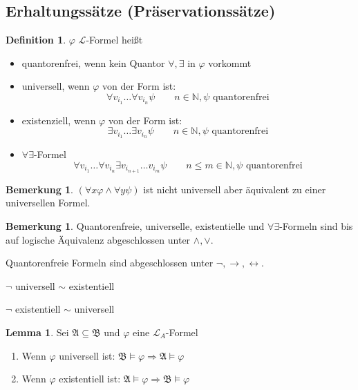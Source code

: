 \documentclass[12pt,parskip=full]{scrartcl}
\newcommand{\setN}{\mathbb{N}}
\theoremstyle{definition}
\newtheorem{lemma}[theorem]{Lemma}
\newtheorem{definition}[theorem]{Definition}
\newtheorem{remark}[theorem]{Bemerkung}
\begin{document}
	\subsection{Erhaltungssätze (Präservationssätze)}
	
	\begin{definition}
		$\varphi$ $\mathcal{L}$-Formel heißt
		\begin{itemize}
			\item quantorenfrei, wenn kein Quantor $\forall, \exists$ in $\varphi$ vorkommt
			\item universell, wenn $\varphi$ von der Form ist:
			\begin{equation*}
				\forall v_{i_1} \dots \forall v_{i_n} \psi \qquad n \in \setN, \psi \text{ quantorenfrei}
			\end{equation*}
			\item existenziell, wenn $\varphi$ von der Form ist:
			\begin{equation*}
				\exists v_{i_1} \dots \exists v_{i_n} \psi \qquad n \in \setN, \psi \text{ quantorenfrei}
			\end{equation*}
			\item $\forall\exists$-Formel
			\begin{equation*}
				\forall v_{i_1} \dots \forall v_{i_n} \exists v_{i_{n+1}} \dots v_{i_m}  \psi \qquad n \leq m \in \setN, \psi \text{ quantorenfrei}
			\end{equation*}
		\end{itemize}
	\end{definition}

	\begin{remark}
		$(\forall x \varphi \land \forall y \psi)$ ist nicht universell aber äquivalent zu einer universellen Formel.
	\end{remark}

	\begin{remark}
		Quantorenfreie, universelle, existentielle und $\forall\exists$-Formeln sind bis auf logische Äquivalenz abgeschlossen unter $\land, \lor$.
		
		Quantorenfreie Formeln sind abgeschlossen unter $\lnot, \rightarrow, \leftrightarrow$.
		
		$\lnot$ universell $\sim$ existentiell
		
		$\lnot$ existentiell $\sim$ universell
	\end{remark}

	\begin{lemma}
		Sei $\mathfrak{A} \subseteq \mathfrak{B}$ und $\varphi$ eine $\mathcal{L}_A$-Formel
		\begin{enumerate}
			\item Wenn $\varphi$ universell ist: $\mathfrak{B} \models \varphi \Rightarrow \mathfrak{A} \models \varphi$
			\item Wenn $\varphi$ existentiell ist: $\mathfrak{A} \models \varphi \Rightarrow \mathfrak{B} \models \varphi$
		\end{enumerate}
	\end{lemma}
	
\end{document}
